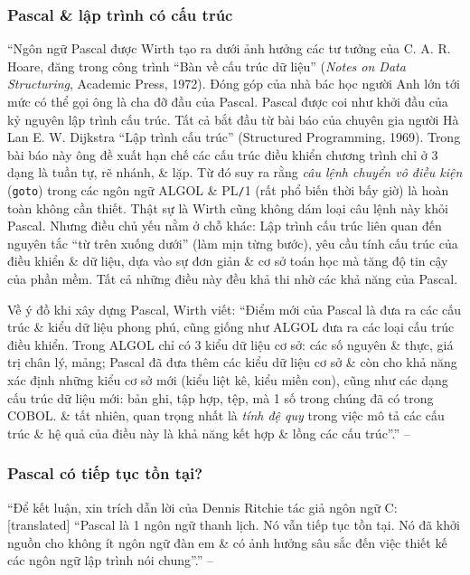 \documentclass[oneside]{book}
\numberwithin{equation}{section}
\begin{document}
\subsubsection{Pascal \& lập trình có cấu trúc}
``Ngôn ngữ Pascal được Wirth tạo ra dưới ảnh hưởng các tư tưởng của C. A. R. Hoare, đăng trong công trình ``Bàn về cấu trúc dữ liệu'' (\textit{Notes on Data Structuring}, Academic Press, 1972). Đóng góp của nhà bác học người Anh lớn tới mức có thể gọi ông là cha đỡ đầu của Pascal. Pascal được coi như khởi đầu của kỷ nguyên lập trình cấu trúc. Tất cả bắt đầu từ bài báo của chuyên gia người Hà Lan E. W. Dijkstra ``Lập trình cấu trúc'' (Structured Programming, 1969). Trong bài báo này ông đề xuất hạn chế các cấu trúc điều khiển chương trình chỉ ở 3 dạng là tuần tự, rẽ nhánh, \& lặp. Từ đó suy ra rằng \textit{câu lệnh chuyển vô điều kiện} (\texttt{goto}) trong các ngôn ngữ ALGOL \& PL\texttt{/}1 (rất phổ biến thời bấy giờ) là hoàn toàn không cần thiết. Thật sự là Wirth cũng không dám loại câu lệnh này khỏi Pascal. Nhưng điều chủ yếu nằm ở chỗ khác: Lập trình cấu trúc liên quan đến nguyên tắc ``từ trên xuống dưới'' (làm mịn từng bước), yêu cầu tính cấu trúc của điều khiển \& dữ liệu, dựa vào sự đơn giản \& cơ sở toán học mà tăng độ tin cậy của phần mềm. Tất cả những điều này đều khả thi nhờ các khả năng của Pascal.

Về ý đồ khi xây dựng Pascal, Wirth viết: ``Điểm mới của Pascal là đưa ra các cấu trúc \& kiểu dữ liệu phong phú, cũng giống như ALGOL đưa ra các loại cấu trúc điều khiển. Trong ALGOL chỉ có 3 kiểu dữ liệu cơ sở: các số nguyên \& thực, giá trị chân lý, mảng; Pascal đã đưa thêm các kiểu dữ liệu cơ sở \& còn cho khả năng xác định những kiểu cơ sở mới (kiểu liệt kê, kiểu miền con), cũng như các dạng cấu trúc dữ liệu mới: bản ghi, tập hợp, tệp, mà 1 số trong chúng đã có trong COBOL. \& tất nhiên, quan trọng nhất là \textit{tính đệ quy} trong việc mô tả các cấu trúc \& hệ quả của điều này là khả năng kết hợp \& lồng các cấu trúc''.'' -- \cite[p. 15]{SGK_Tin_Hoc_11}

\subsubsection{Pascal có tiếp tục tồn tại?}
``Để kết luận, xin trích dẫn lời của Dennis Ritchie tác giả ngôn ngữ C: [translated] ``Pascal là 1 ngôn ngữ thanh lịch. Nó vẫn tiếp tục tồn tại. Nó đã khởi nguồn cho không ít ngôn ngữ đàn em \& có ảnh hưởng sâu sắc đến việc thiết kế các ngôn ngữ lập trình nói chung''.'' -- \cite[p. 15]{SGK_Tin_Hoc_11}
\end{document}
